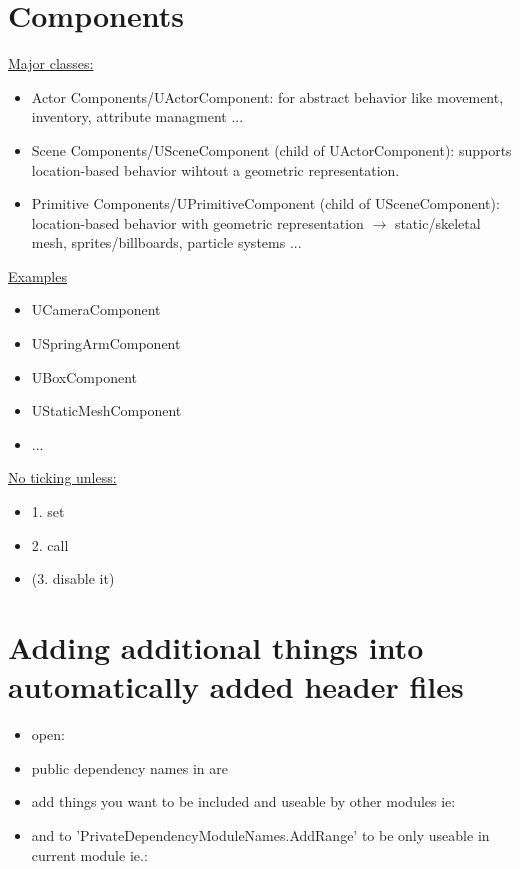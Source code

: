 \smallskip
    
\smallskip
    
    \section{Components}
        \uline{Major classes:}
        \begin{itemize}
            \item Actor Components/UActorComponent: for abstract behavior like movement, inventory, attribute managment ...
            \item Scene Components/USceneComponent (child of UActorComponent): supports location-based behavior wihtout a geometric representation.
            \item Primitive Components/UPrimitiveComponent (child of USceneComponent):  location-based behavior with geometric representation $\rightarrow$ static/skeletal mesh, sprites/billboards, particle systems ...
        \end{itemize}
        \uline{Examples}
        \begin{itemize}
            \item UCameraComponent
            \item USpringArmComponent
            \item UBoxComponent
            \item UStaticMeshComponent
            \item ...
        \end{itemize}
        \uline{No ticking unless:}
        \begin{itemize}
            \item 1. set 
            \item 2. call 
            \item (3. disable it) 
        \end{itemize}

    \section{Adding additional things into automatically added header files}
        \begin{itemize}
            \item open: 
            \item public dependency names in  are 
            \item add things you want to be included and useable by other modules ie: 
            \item and to 'PrivateDependencyModuleNames.AddRange' to be only useable in current module ie.: 
        \end{itemize}

